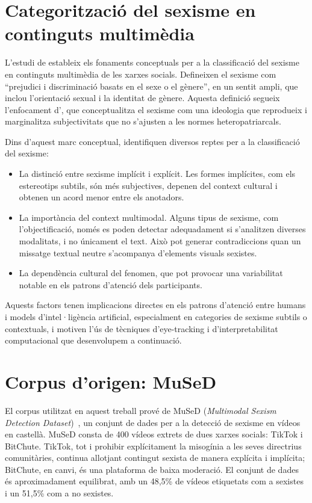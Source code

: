\section{Categorització del sexisme en continguts multimèdia}\label{ch:marc}

L'estudi de \textcite{mused} estableix els fonaments conceptuals per a la classificació del sexisme en continguts multimèdia de les xarxes socials.
Defineixen el sexisme com ``prejudici i discriminació basats en el sexe o el gènere'', en un sentit ampli, que inclou l'orientació sexual i la identitat de gènere.
Aquesta definició segueix l'enfocament d'\textcite{o2009encyclopedia}, que conceptualitza el sexisme com una ideologia que reprodueix i marginalitza subjectivitats que no s'ajusten a les normes heteropatriarcals.

Dins d'aquest marc conceptual, \textcite{mused} identifiquen diversos reptes per a la classificació del sexisme:
\begin{itemize}
    \item La distinció entre sexisme implícit i explícit. Les formes implícites, com els estereotips subtils, són més subjectives, depenen del context cultural i obtenen un acord menor entre els anotadors.
    \item La importància del context multimodal. Alguns tipus de sexisme, com l'objectificació, només es poden detectar adequadament si s'analitzen diverses modalitats, i no únicament el text. Això pot generar contradiccions quan un missatge textual neutre s'acompanya d'elements visuals sexistes.
    \item La dependència cultural del fenomen, que pot provocar una variabilitat notable en els patrons d'atenció dels participants.
\end{itemize}
Aquests factors tenen implicacions directes en els patrons d'atenció entre humans i models d'intel·ligència artificial, especialment en categories de sexisme subtils o contextuals, i motiven l'ús de tècniques d'eye-tracking i d'interpretabilitat computacional que desenvolupem a continuació.

\section{Corpus d'origen: MuSeD}\label{sec:mused}

El corpus utilitzat en aquest treball prové de MuSeD (\textit{Multimodal Sexism Detection Dataset})~\cite{mused}, un conjunt de dades per a la detecció de sexisme en vídeos en castellà.
MuSeD consta de 400 vídeos extrets de dues xarxes socials: TikTok i BitChute.
TikTok, tot i prohibir explícitament la misogínia a les seves directrius comunitàries, continua allotjant contingut sexista de manera explícita i implícita; BitChute, en canvi, és una plataforma de baixa moderació.
El conjunt de dades és aproximadament equilibrat, amb un 48,5\% de vídeos etiquetats com a sexistes i un 51,5\% com a no sexistes.


